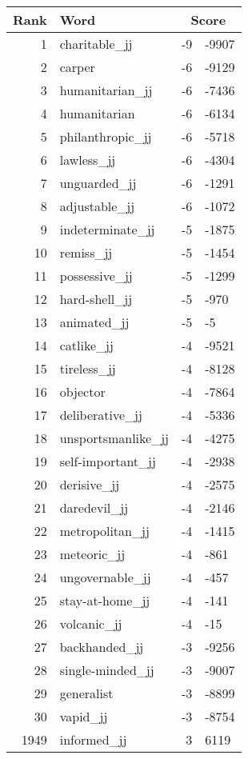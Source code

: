\begin{longtable}[!htbp]{| rlr@{.}l |}
    \hline
    \textbf{Rank} & \textbf{Word} & \multicolumn{2}{c|}{\textbf{Score}} \\
    \hline
    \endhead
    1 & charitable\_jj & -9 & -9907 \\
    2 & carper & -6 & -9129 \\
    3 & humanitarian\_jj & -6 & -7436 \\
    4 & humanitarian & -6 & -6134 \\
    5 & philanthropic\_jj & -6 & -5718 \\
    6 & lawless\_jj & -6 & -4304 \\
    7 & unguarded\_jj & -6 & -1291 \\
    8 & adjustable\_jj & -6 & -1072 \\
    9 & indeterminate\_jj & -5 & -1875 \\
    10 & remiss\_jj & -5 & -1454 \\
    11 & possessive\_jj & -5 & -1299 \\
    12 & hard-shell\_jj & -5 & -970 \\
    13 & animated\_jj & -5 & -5 \\
    14 & catlike\_jj & -4 & -9521 \\
    15 & tireless\_jj & -4 & -8128 \\
    16 & objector & -4 & -7864 \\
    17 & deliberative\_jj & -4 & -5336 \\
    18 & unsportsmanlike\_jj & -4 & -4275 \\
    19 & self-important\_jj & -4 & -2938 \\
    20 & derisive\_jj & -4 & -2575 \\
    21 & daredevil\_jj & -4 & -2146 \\
    22 & metropolitan\_jj & -4 & -1415 \\
    23 & meteoric\_jj & -4 & -861 \\
    24 & ungovernable\_jj & -4 & -457 \\
    25 & stay-at-home\_jj & -4 & -141 \\
    26 & volcanic\_jj & -4 & -15 \\
    27 & backhanded\_jj & -3 & -9256 \\
    28 & single-minded\_jj & -3 & -9007 \\
    29 & generalist & -3 & -8899 \\
    30 & vapid\_jj & -3 & -8754 \\
    1949 & informed\_jj & 3 & 6119 \\

\end{longtable}
